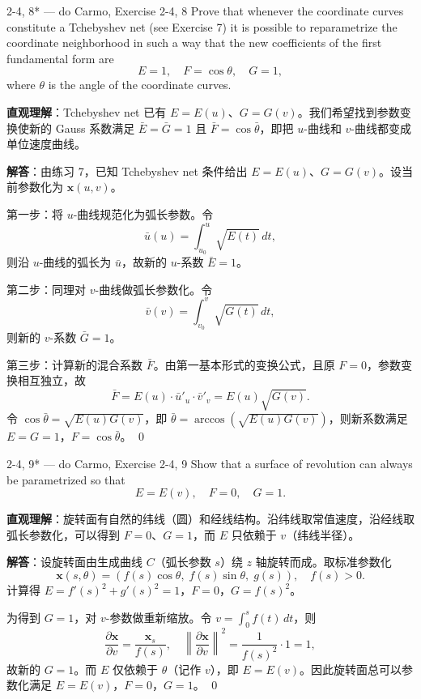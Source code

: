 \begin{exercise}{2-4, 8* — do Carmo, Exercise 2-4, 8}
Prove that whenever the coordinate curves constitute a Tchebyshev net (see Exercise 7) it is possible to reparametrize the coordinate neighborhood in such a way that the new coefficients of the first fundamental form are
\[
E = 1, \quad F = \cos \theta, \quad G = 1,
\]
where $\theta$ is the angle of the coordinate curves.
\end{exercise}

\begin{solution}
\textbf{直观理解}：Tchebyshev net 已有 $E = E(u)$、$G = G(v)$。我们希望找到参数变换使新的 Gauss 系数满足 $\bar{E} = \bar{G} = 1$ 且 $\bar{F} = \cos\bar{\theta}$，即把 $u$-曲线和 $v$-曲线都变成单位速度曲线。

\textbf{解答}：由练习 7，已知 Tchebyshev net 条件给出 $E = E(u)$、$G = G(v)$。设当前参数化为 $\mathbf{x}(u,v)$。

第一步：将 $u$-曲线规范化为弧长参数。令
\[
\bar{u}(u) = \int_{u_0}^u \sqrt{E(t)}\, dt,
\]
则沿 $u$-曲线的弧长为 $\bar{u}$，故新的 $u$-系数 $\bar{E} = 1$。

第二步：同理对 $v$-曲线做弧长参数化。令
\[
\bar{v}(v) = \int_{v_0}^v \sqrt{G(t)}\, dt,
\]
则新的 $v$-系数 $\bar{G} = 1$。

第三步：计算新的混合系数 $\bar{F}$。由第一基本形式的变换公式，且原 $F = 0$，参数变换相互独立，故
\[
\bar{F} = E(u) \cdot \bar{u}'_u \cdot \bar{v}'_v = E(u) \sqrt{G(v)}.
\]
令 $\cos\bar\theta = \sqrt{E(u)G(v)}$，即 $\bar\theta = \arccos(\sqrt{E(u)G(v)})$，则新系数满足 $E = G = 1$，$F = \cos\bar\theta$。
\qed
\end{solution}

\begin{exercise}{2-4, 9* — do Carmo, Exercise 2-4, 9}
Show that a surface of revolution can always be parametrized so that
\[
E = E(v), \quad F = 0, \quad G = 1.
\]
\end{exercise}

\begin{solution}
\textbf{直观理解}：旋转面有自然的纬线（圆）和经线结构。沿纬线取常值速度，沿经线取弧长参数化，可以得到 $F = 0$、$G = 1$，而 $E$ 只依赖于 $v$（纬线半径）。

\textbf{解答}：设旋转面由生成曲线 $C$（弧长参数 $s$）绕 $z$ 轴旋转而成。取标准参数化
\[
\mathbf{x}(s, \theta) = (f(s)\cos\theta,\; f(s)\sin\theta,\; g(s)),\quad f(s) > 0.
\]
计算得 $E = f'(s)^2 + g'(s)^2 = 1$，$F = 0$，$G = f(s)^2$。

为得到 $G = 1$，对 $v$-参数做重新缩放。令 $v = \int_0^s f(t)\, dt$，则
\[
\frac{\partial\mathbf{x}}{\partial v} = \frac{\mathbf{x}_s}{f(s)},\quad
\left\|\frac{\partial\mathbf{x}}{\partial v}\right\|^2 = \frac{1}{f(s)^2}\cdot 1 = 1,
\]
故新的 $G = 1$。而 $E$ 仅依赖于 $\theta$（记作 $v$），即 $E = E(v)$。因此旋转面总可以参数化满足 $E = E(v)$，$F = 0$，$G = 1$。
\qed
\end{solution}

